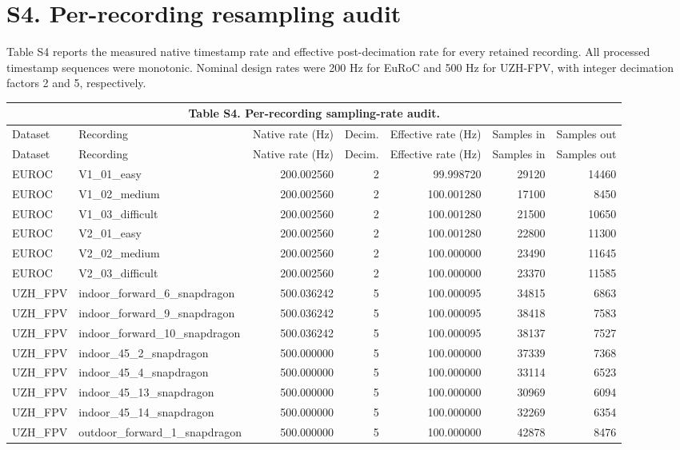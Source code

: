 \documentclass[11pt]{article}
\begin{document}
\section*{S4. Per-recording resampling audit}
Table S4 reports the measured native timestamp rate and effective post-decimation rate for every retained recording. All processed timestamp sequences were monotonic. Nominal design rates were 200 Hz for EuRoC and 500 Hz for UZH-FPV, with integer decimation factors 2 and 5, respectively.
\begin{landscape}
\begin{longtable}{p{1.6cm}p{6.0cm}rrrrr}
\multicolumn{7}{c}{\normalsize Table S4. Per-recording sampling-rate audit.}\\[0.4em]
\toprule
Dataset & Recording & Native rate (Hz) & Decim. & Effective rate (Hz) & Samples in & Samples out\\
\midrule
\endfirsthead
\toprule
Dataset & Recording & Native rate (Hz) & Decim. & Effective rate (Hz) & Samples in & Samples out\\
\midrule
\endhead
EUROC & V1\_01\_easy & 200.002560 & 2 & 99.998720 & 29120 & 14460 \\
EUROC & V1\_02\_medium & 200.002560 & 2 & 100.001280 & 17100 & 8450 \\
EUROC & V1\_03\_difficult & 200.002560 & 2 & 100.001280 & 21500 & 10650 \\
EUROC & V2\_01\_easy & 200.002560 & 2 & 100.001280 & 22800 & 11300 \\
EUROC & V2\_02\_medium & 200.002560 & 2 & 100.000000 & 23490 & 11645 \\
EUROC & V2\_03\_difficult & 200.002560 & 2 & 100.000000 & 23370 & 11585 \\
UZH\_FPV & indoor\_forward\_6\_snapdragon & 500.036242 & 5 & 100.000095 & 34815 & 6863 \\
UZH\_FPV & indoor\_forward\_9\_snapdragon & 500.036242 & 5 & 100.000095 & 38418 & 7583 \\
UZH\_FPV & indoor\_forward\_10\_snapdragon & 500.036242 & 5 & 100.000095 & 38137 & 7527 \\
UZH\_FPV & indoor\_45\_2\_snapdragon & 500.000000 & 5 & 100.000000 & 37339 & 7368 \\
UZH\_FPV & indoor\_45\_4\_snapdragon & 500.000000 & 5 & 100.000000 & 33114 & 6523 \\
UZH\_FPV & indoor\_45\_13\_snapdragon & 500.000000 & 5 & 100.000000 & 30969 & 6094 \\
UZH\_FPV & indoor\_45\_14\_snapdragon & 500.000000 & 5 & 100.000000 & 32269 & 6354 \\
UZH\_FPV & outdoor\_forward\_1\_snapdragon & 500.000000 & 5 & 100.000000 & 42878 & 8476 \\
\bottomrule
\end{longtable}
\end{landscape}
\end{document}
